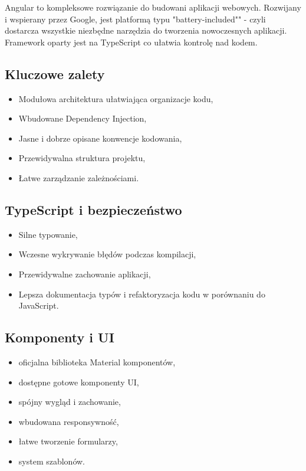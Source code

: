 Angular to kompleksowe rozwiązanie do budowani aplikacji webowych. Rozwijany i wspierany przez Google, jest platformą typu "battery-included"" - czyli dostarcza wszystkie niezbędne narzędzia do tworzenia nowoczesnych aplikacji. Framework oparty jest na TypeScript co ułatwia kontrolę nad kodem.

\subsection{Kluczowe zalety}
\begin{itemize}
	\item Modułowa architektura ułatwiająca organizacje kodu,
	\item Wbudowane Dependency Injection,
	\item Jasne i dobrze opisane konwencje kodowania,
	\item Przewidywalna struktura projektu,
	\item Łatwe zarządzanie zależnościami.
\end{itemize}

\subsection{TypeScript i bezpieczeństwo}
\begin{itemize}
	\item Silne typowanie,
	\item Wczesne wykrywanie błędów podczas kompilacji,
	\item Przewidywalne zachowanie aplikacji,
	\item Lepsza dokumentacja typów i refaktoryzacja kodu w porównaniu do JavaScript.
\end{itemize}

\subsection{Komponenty i UI}
\begin{itemize}
	\item oficjalna biblioteka Material komponentów,
	\item dostępne gotowe komponenty UI,
	\item spójny wygląd i zachowanie,
	\item wbudowana responsywność,
	\item łatwe tworzenie formularzy,
	\item system szablonów.
\end{itemize}


